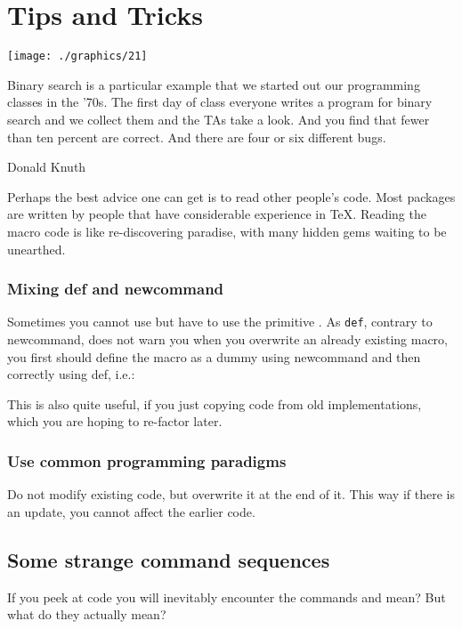 
\chapter{Tips and Tricks}
\begin{marginfigure}%
  \texttt{[image: ./graphics/21]}
    \label{fig:marginfig1}
\end{marginfigure}

\epigraph{Binary search is a particular example that we started out our programming classes in the ’70s. The first day of class everyone writes a program for binary search and we collect them and the TAs take a look. And you find
that fewer than ten percent are correct. And there are four or six different
bugs.}{Donald Knuth}


Perhaps the best advice one can get is to read other people's code. Most packages are written by people
that have considerable experience in \TeX. Reading the macro code is like re-discovering paradise, with many hidden gems waiting to be unearthed.
\subsection{Mixing def and newcommand}
Sometimes you cannot use
 but have to use the \tex primitive . As \texttt{\BS def}, contrary to
newcommand, does not warn you when you overwrite an already existing macro,
you first should define the macro as a dummy using newcommand and then correctly
using def, i.e.: 

\begin{teXXX}
\newcommand{\test@}{}
\long\def\test@[#1][#2][#3][#4]{%
  ....
}
\end{teXXX}

This is also quite useful, if you just copying code from old implementations, which you are hoping to re-factor later.

\subsection{Use common programming paradigms}
Do not modify existing code, but overwrite it at the end of it. 
This way if there is an update, you cannot affect the earlier code.


\section{Some strange command sequences}
If you peek at code you will inevitably encounter the commands
  and  mean? But what do they actually mean?


